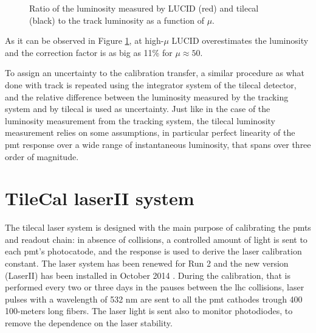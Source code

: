 \begin{figure}[ht]
\centering
{}
\caption{Ratio of the luminosity measured by LUCID (red) and \gls{tilecal} (black) to the track luminosity as a function of $\mu$.}
\label{fig:apppmt:calib_transfer}
\end{figure}

As it can be observed in Figure \ref{fig:apppmt:calib_transfer}, at high-$\mu$ LUCID overestimates the luminosity and 
the correction factor is as big as 11\% for $\mu \approx 50$. 

To assign an uncertainty to the calibration transfer, a similar procedure as what done with track is repeated using the 
integrator system of the \gls{tilecal} detector, and the relative difference between the luminosity measured by the tracking system and 
by \gls{tilecal}  is used as uncertainty. 
Just like in the case of the luminosity measurement from the tracking system, the \gls{tilecal} luminosity measurement 
relies on some assumptions, in particular perfect linearity of the \gls{pmt} response over a wide range of instantaneous luminosity, 
that spans over three order of magnitude. 


\section{TileCal laserII system}
\label{sec:app:laser}

The \gls{tilecal} laser system \cite{system:2016tae} is designed with the main purpose of calibrating the \glspl{pmt} and readout chain: 
in absence of collisions, a controlled amount of light is sent to each \gls{pmt}'s photocatode, 
and the response is used to derive the laser calibration constant. 
The laser system has been renewed for Run 2 and the new version (LaserII)
has been installed in October 2014 \cite{Scuri:2016ctn}. 
During the calibration, that is performed every two or three days in the 
pauses between the \gls{lhc} collisions,
laser pulses with a wavelength of 532 nm are sent to all the \gls{pmt} cathodes 
trough 400 100-meters long fibers. 
The laser light is sent also to monitor photodiodes, to remove the dependence on the laser stability. 

